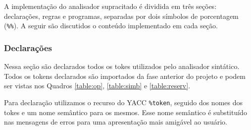 \documentclass {article}
\begin{document}
		A implementação do analisador supracitado é dividida em três seções: declarações, regras e programas, separadas por dois símbolos de porcentagem (\verb=%%=). A seguir são discutidos o conteúdo implementado em cada seção. 


		\subsubsection{Declarações}
			Nessa seção são declarados todos os tokes utilizados pelo analisador sintático. Todos os tokens declarados são importados da fase anterior do projeto e podem ser vistas nos Quadros \ref{table:op}, \ref{table:simb} e \ref{table:reserv}. 

			Para declaração utilizamos o recurso do YACC \verb=%token=, seguido dos nomes dos tokes e um nome semântico para os mesmos. Esse nome semântico é substituído nas mensagens de erros para uma apresentação mais amigável ao usuário.
\end{document}
